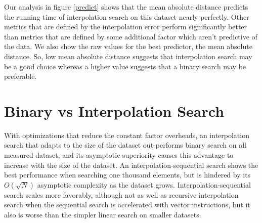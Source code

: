 \documentclass[twocolumn]{article}
\begin{document}
Our analysis in figure \ref{predict} shows that the mean absolute distance predicts the running time of interpolation search on this dataset nearly perfectly. Other metrics that are defined by the interpolation error perform significantly better than metrics that are defined by some additional factor which aren't predictive of the data. We also show the raw values for the best predictor, the mean absolute distance. So, low mean absolute distance suggests that interpolation search may be a good choice whereas a higher value suggests that a binary search may be preferable.


\begin{figure}[t]
\end{figure} \label{predict}

\begin{figure}[t]
\end{figure}

\section{Binary vs Interpolation Search}

With optimizations that reduce the constant factor overheads, an interpolation search that adapts to the size of the dataset out-performs binary search on all measured dataset, and its asymptotic superiority causes this advantage to increase with the size of the dataset. An interpolation-sequential search shows the best performance when searching one thousand elements, but is hindered by its $O(\sqrt N)$ asymptotic complexity as the dataset grows. Interpolation-sequential search scales more favorably, although not as well as recursive interpolation search when the sequential search is accelerated with vector instructions, but it also is worse than the simpler linear search on smaller datasets.
\end{document}
